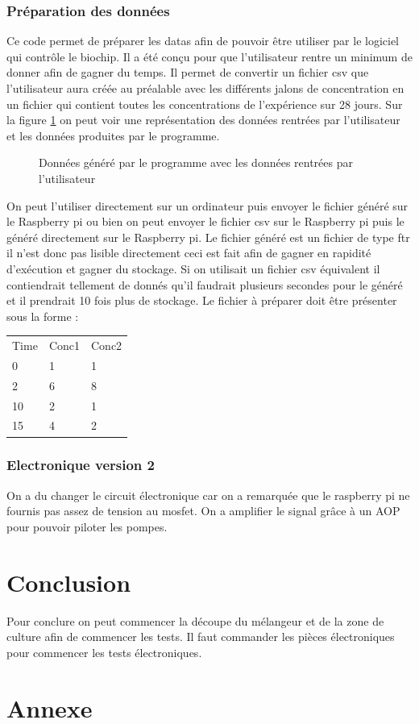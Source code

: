 \documentclass[a4paper, 11pt]{article}
\begin{document}
\subsubsection{Préparation des données}
Ce code permet de préparer les datas afin de pouvoir être utiliser par le logiciel qui contrôle le biochip.
Il a été conçu pour que l'utilisateur rentre un minimum de donner afin de gagner du temps.
Il permet de convertir un fichier csv que l'utilisateur aura créée au préalable avec les différents jalons de concentration en un fichier qui contient toutes les concentrations de l'expérience sur 28 jours.
Sur la figure \ref{fig:dataPreparation} on peut voir une représentation des données rentrées par l'utilisateur et les données produites par le programme.
\begin{figure}[H]
    \centering
    \caption{Données généré par le programme avec les données rentrées par l'utilisateur}
    \label{fig:dataPreparation}
\end{figure}
On peut l'utiliser directement sur un ordinateur puis envoyer le fichier généré sur le Raspberry pi ou bien on peut envoyer le fichier csv sur le Raspberry pi puis le généré directement sur le Raspberry pi.
Le fichier généré est un fichier de type ftr il n'est donc pas lisible directement ceci est fait afin de gagner en rapidité d'exécution et gagner du stockage.
Si on utilisait un fichier csv équivalent il contiendrait tellement de donnés qu'il faudrait plusieurs secondes pour le généré et il prendrait 10 fois plus de stockage.
Le fichier à préparer doit être présenter sous la forme :
\begin{table}[H]
    \centering
    \begin{tabular}{lll}
        Time & Conc1 & Conc2 \\
        0    & 1     & 1     \\
        2    & 6     & 8     \\
        10   & 2     & 1     \\
        15   & 4     & 2
    \end{tabular}
\end{table}
\subsubsection{Electronique version 2}
On a du changer le circuit électronique car on a remarquée que le raspberry pi ne fournis pas assez de tension au mosfet.
On a amplifier le signal grâce à un AOP pour pouvoir piloter les pompes.
\newpage
\section{Conclusion}
Pour conclure on peut commencer la découpe du mélangeur et de la zone de culture afin de commencer les tests.
Il faut commander les pièces électroniques pour commencer les tests électroniques.
\newpage
\section{Annexe}

\newpage
\printbibliography
\end{document}
